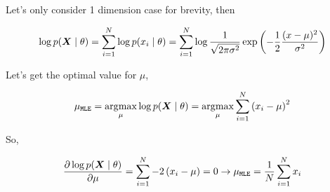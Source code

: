 Let's only consider 1 dimension case for brevity, then

\begin{equation}
	\log p\giventhat{\vX}{\theta}  = \sum_{i=1}^{N} \log p\giventhat{x_i}{\theta} = \sum_{i=1}^{N} \log \frac{1}{\sqrt{2\pi \sigma^2}} \exp\left(-\frac{1}{2} \frac{(x - \mu)^2}{\sigma^2}\right)
\end{equation}

Let's get the optimal value for \(\mu\),

\begin{equation}
	\mu_{\mathtt{MLE}} = \argmax_{\mu} \log p\giventhat{\vX}{\theta} = \argmax_{\mu} \sum_{i=1}^{N} \left(x_i - \mu\right)^2
\end{equation}

So,

\begin{equation}
	\frac{\partial \log p\giventhat{\vX}{\theta}}{\partial \mu} = \sum_{i=1}^{N} -2 \left(x_i - \mu\right) = 0 \rightarrow \mu_{\mathtt{MLE}} = \frac{1}{N} \sum_{i=1}^{N} x_i
\end{equation}
